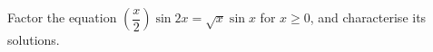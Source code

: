 Factor the equation $(\dfrac{x}{2}) \sin 2 x = \sqrt{x} \sin x$ for $x\ge0$, and characterise its solutions.
